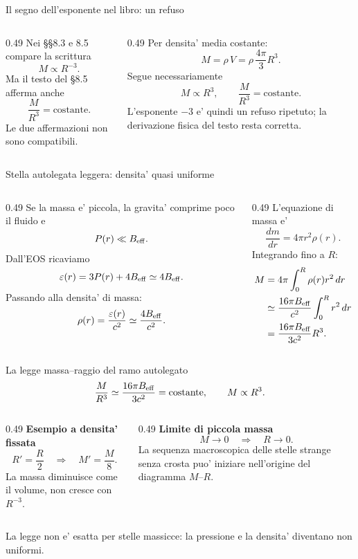 \begin{frame}{Il segno dell'esponente nel libro: un refuso}
\small
\begin{columns}[T,onlytextwidth]
\begin{column}{0.49\textwidth}
Nei \S\S8.3 e 8.5 compare la scrittura
\[
M\propto R^{-3}.
\]
Ma il testo del \S8.5 afferma anche
\[
\frac{M}{R^3}=\text{costante}.
\]
Le due affermazioni non sono compatibili.
\end{column}
\begin{column}{0.49\textwidth}
Per densita' media costante:
\[
M=\rho\,V=\rho\,\frac{4\pi}{3}R^3.
\]
Segue necessariamente
\[
M\propto R^3, \qquad \frac{M}{R^3}=\text{costante}.
\]
L'esponente $-3$ e' quindi un refuso ripetuto; la derivazione fisica del testo resta corretta.
\end{column}
\end{columns}
\end{frame}

\begin{frame}{Stella autolegata leggera: densita' quasi uniforme}
\small
\begin{columns}[T,onlytextwidth]
\begin{column}{0.49\textwidth}
Se la massa e' piccola, la gravita' comprime poco il fluido e
\[
P(r)\ll B_{\rm eff}.
\]
Dall'EOS ricaviamo
\[
\varepsilon(r)=3P(r)+4B_{\rm eff}
\simeq4B_{\rm eff}.
\]
Passando alla densita' di massa:
\[
\rho(r)=\frac{\varepsilon(r)}{c^2}
\simeq\frac{4B_{\rm eff}}{c^2}.
\]
\end{column}
\begin{column}{0.49\textwidth}
L'equazione di massa e'
\[
\frac{dm}{dr}=4\pi r^2\rho(r).
\]
Integrando fino a $R$:
\[
\begin{aligned}
M&=4\pi\int_0^R\rho(r)r^2\,dr\\
&\simeq\frac{16\pi B_{\rm eff}}{c^2}
\int_0^R r^2\,dr\\
&=\frac{16\pi B_{\rm eff}}{3c^2}R^3.
\end{aligned}
\]
\end{column}
\end{columns}
\end{frame}

\begin{frame}{La legge massa--raggio del ramo autolegato}
\small
\[
\frac{M}{R^3}\simeq\frac{16\pi B_{\rm eff}}{3c^2}
=\text{costante},\qquad M\propto R^3.
\]
\begin{columns}[T,onlytextwidth]
\begin{column}{0.49\textwidth}
\textbf{Esempio a densita' fissata}
\[
R' = \frac{R}{2}
\quad\Longrightarrow\quad
M' = \frac{M}{8}.
\]
La massa diminuisce come il volume, non cresce con $R^{-3}$.
\end{column}
\begin{column}{0.49\textwidth}
\textbf{Limite di piccola massa}
\[
M\to0 \quad\Longrightarrow\quad R\to0.
\]
La sequenza macroscopica delle stelle strange senza crosta puo' iniziare nell'origine del diagramma $M$--$R$.
\end{column}
\end{columns}
\medskip
La legge non e' esatta per stelle massicce: la pressione e la densita' diventano non uniformi.
\end{frame}

